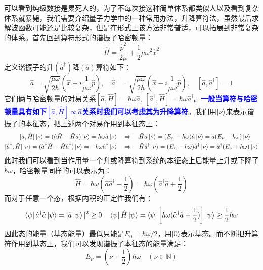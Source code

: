 可以看到纯级数接是累死人的，为了不每次接这种简单体系都类似人以及看到复杂体系就暴毙，我们需要介绍量子力学中的一种常用办法，升降算符法，虽然最后求解波函数可能还是比较复杂，但是在形式上该方法非常普适，可以拓展到非常复杂的体系。首先回到算符形式的谐振子哈密顿量：
\[\hat{H}=\frac{\hat{p}^2}{2\mu}+\frac{1}{2}\mu\omega^2\hat{x}^2\]
定义谐振子的升$(\hat{a}^{\dagger})$降$(\hat{a})$算符如下：
\[\hat{a}=\sqrt{\frac{\mu\omega}{2\hbar}}(\hat{x}+i\frac{1}{\mu\omega}\hat{p}), \quad \hat{a}^+=\sqrt{\frac{\mu\omega}{2\hbar}}(\hat{x}-i\frac{1}{\mu\omega}\hat{p}), \quad [\hat{a},\hat{a}^{\dagger}]=1\]
它们俩与哈密顿量的对易关系$[\hat{a},\hat{H}]=\hbar\omega\hat{a}, \ [\hat{a}^{\dagger},\hat{H}]=\hbar\omega\hat{a}^{\dagger}$。\textcolor{blue}{\textbf{一般当算符与哈密顿量具有如下$[\hat{a},\hat{H}]\propto\hat{a}$关系时我们可以考虑其为升降算符}}。我们用$\ket{\nu}$来表示谐振子的本征态，把上述两个对易作用到本征态上：
\begin{equation}
\begin{aligned}
[\hat{a},\hat{H}]\ket{\nu}=(\hat{a}\hat{H}-\hat{H}\hat{a})\ket{\nu}=\hbar\omega\hat{a}\ket{\nu} \quad &\Rightarrow \quad \hat{H}\hat{a}\ket{\nu}=(E_n-\hbar\omega)\hat{a}\ket{\nu}=\hat{a}(E_{\nu}-\hbar\omega)\ket{\nu}\\
[\hat{a}^{\dagger},\hat{H}]\ket{\nu}=(\hat{a}^{\dagger}\hat{H}-\hat{H}\hat{a}^{\dagger})\ket{\nu}=-\hbar\omega\hat{a}^{\dagger}\ket{\nu} \quad &\Rightarrow \quad \hat{H}\hat{a}^{\dagger}\ket{\nu}=(E_n+\hbar\omega)\hat{a}^{\dagger}\ket{\nu}=\hat{a}^{\dagger}(E_{\nu}+\hbar\omega)\ket{\nu}
\end{aligned}\label{comma}
\end{equation}
此时我们可以看到当作用量一个升或降算符到系统的本征态上后能量上升或下降了$\hbar\omega$，哈密顿量同样的可以表示为：
\[\hat{H}=\hbar\omega(\hat{a}\hat{a}^{\dagger}-\frac{1}{2})=\hbar\omega(\hat{a}^{\dagger}\hat{a}+\frac{1}{2})\]
而对于任意一个态，根据内积的正定性我们有：
\[\bra{\psi}\hat{a}^{\dagger}\hat{a}\ket{\psi}=|\hat{a}\ket{\psi}|^2\geq0 \quad \bra{\psi}\hat{H}\ket{\psi}=\bra{\psi}\left[\hbar\omega(\hat{a}^{\dagger}\hat{a}+\frac{1}{2})\right]\ket{\psi}\geq\frac{1}{2}\hbar\omega\]
因此态的能量（基态能量）最低只能是$E_0=\hbar\omega/2$，用$\ket{0}$表示基态。而不断把升算符作用到基态上，我们可以发现谐振子本征态的能量满足：
\[E_{\nu}=(\nu+\frac{1}{2})\hbar\omega \quad (\nu \in \mathbb{N})\]

